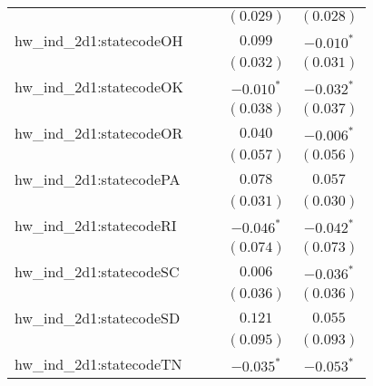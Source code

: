 \begin{center}
\begin{longtable}{l c c c c}
                         &                       &                       & $(0.029)$             & $(0.028)$             \\
hw\_ind\_2d1:statecodeOH &                       &                       & $0.099$               & $\mathbf{-0.010}^{*}$ \\
                         &                       &                       & $(0.032)$             & $(0.031)$             \\
hw\_ind\_2d1:statecodeOK &                       &                       & $\mathbf{-0.010}^{*}$ & $\mathbf{-0.032}^{*}$ \\
                         &                       &                       & $(0.038)$             & $(0.037)$             \\
hw\_ind\_2d1:statecodeOR &                       &                       & $0.040$               & $\mathbf{-0.006}^{*}$ \\
                         &                       &                       & $(0.057)$             & $(0.056)$             \\
hw\_ind\_2d1:statecodePA &                       &                       & $0.078$               & $0.057$               \\
                         &                       &                       & $(0.031)$             & $(0.030)$             \\
hw\_ind\_2d1:statecodeRI &                       &                       & $\mathbf{-0.046}^{*}$ & $\mathbf{-0.042}^{*}$ \\
                         &                       &                       & $(0.074)$             & $(0.073)$             \\
hw\_ind\_2d1:statecodeSC &                       &                       & $0.006$               & $\mathbf{-0.036}^{*}$ \\
                         &                       &                       & $(0.036)$             & $(0.036)$             \\
hw\_ind\_2d1:statecodeSD &                       &                       & $0.121$               & $0.055$               \\
                         &                       &                       & $(0.095)$             & $(0.093)$             \\
hw\_ind\_2d1:statecodeTN &                       &                       & $\mathbf{-0.035}^{*}$ & $\mathbf{-0.053}^{*}$ \\

\end{longtable}
\end{center}

